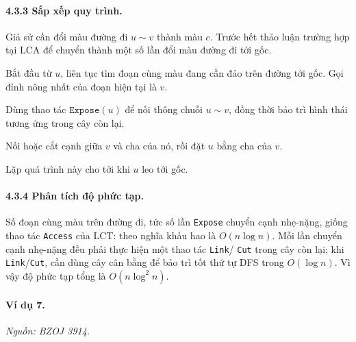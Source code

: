 \documentclass[11pt]{article}
\begin{document}
\begin{center}
\end{center}

\paragraph{4.3.3 Sắp xếp quy trình.}
Giả sử cần đổi màu đường đi \(u\sim v\) thành màu \(c\). Trước hết thảo luận
trường hợp tại LCA để chuyển thành một số lần đổi màu đường đi tới gốc.

Bắt đầu từ \(u\), liên tục tìm đoạn cùng màu đang cần đảo trên đường tới gốc.
Gọi đỉnh nông nhất của đoạn hiện tại là \(v\).

Dùng thao tác \(\texttt{Expose}(u)\) để nối thông chuỗi \(u\sim v\), đồng thời
bảo trì hình thái tương ứng trong cây còn lại.

Nối hoặc cắt cạnh giữa \(v\) và cha của nó, rồi đặt \(u\) bằng cha của \(v\).

Lặp quá trình này cho tới khi \(u\) leo tới gốc.

\paragraph{4.3.4 Phân tích độ phức tạp.}
Số đoạn cùng màu trên đường đi, tức số lần \texttt{Expose} chuyển cạnh nhẹ-nặng,
giống thao tác \texttt{Access} của LCT: theo nghĩa khấu hao là \(O(n\log n)\).
Mỗi lần chuyển cạnh nhẹ-nặng đều phải thực hiện một thao tác \texttt{Link}/
\texttt{Cut} trong cây còn lại; khi \texttt{Link}/\texttt{Cut}, cần dùng cây cân
bằng để bảo trì tốt thứ tự DFS trong \(O(\log n)\). Vì vậy độ phức tạp tổng là
\(O(n\log^2 n)\).

\paragraph{Ví dụ 7.}
\emph{Nguồn: BZOJ 3914.}
\end{document}

